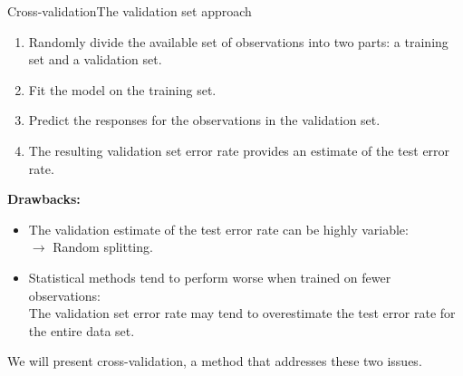 \begin{frame}{Cross-validation}{The validation set approach}
    
\begin{enumerate}
    \item Randomly divide the available set of observations into two parts: a training set and a validation set. \pause
    \item Fit the model on the training set. \pause
    \item Predict the responses for the observations in the validation set. \pause
    \item The resulting validation set error rate provides an estimate of the test error rate. \pause
\end{enumerate}

\begin{block}{\textbf{Drawbacks:}}
\begin{itemize}
    \item The validation estimate of the test error rate can be highly variable:  \pause
    \\ $\rightarrow$ Random splitting.  \pause

    \item Statistical methods tend to perform worse when trained on fewer observations: \pause \\  The validation set error rate may tend to overestimate the test error rate for the entire data set. \pause 
\end{itemize}

    
\end{block}

We will present cross-validation, a method that addresses these two issues. 
\end{frame}